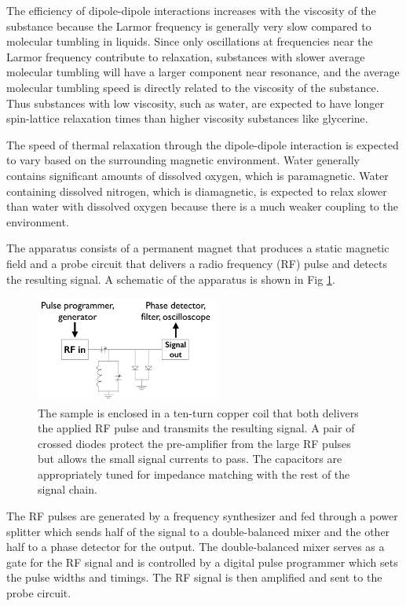 The efficiency of dipole-dipole interactions increases with the viscosity of the substance because the Larmor frequency is generally very slow compared to molecular tumbling in liquids. Since only oscillations at frequencies near the Larmor frequency contribute to relaxation, substances with slower average molecular tumbling will have a larger component near resonance, and the average molecular tumbling speed is directly related to the viscosity of the substance. Thus substances with low viscosity, such as water, are expected to have longer spin-lattice relaxation times than higher viscosity substances like glycerine.

The speed of thermal relaxation through the dipole-dipole interaction is expected to vary based on the surrounding magnetic environment. Water generally contains significant amounts of dissolved oxygen, which is paramagnetic. Water containing dissolved nitrogen, which is diamagnetic, is expected to relax slower than water with dissolved oxygen because there is a much weaker coupling to the environment.

The apparatus consists of a permanent magnet that produces a static magnetic field and a probe circuit that delivers a radio frequency (RF) pulse and detects the resulting signal. A schematic of the apparatus is shown in Fig \ref{fig:app}.

\begin{figure}[htb]
\includegraphics[width=6cm]{apparatus.png}
\caption{The sample is enclosed in a ten-turn copper coil that both delivers the applied RF pulse and transmits the resulting signal. A pair of crossed diodes protect the pre-amplifier from the large RF pulses but allows the small signal currents to pass. The capacitors are appropriately tuned for impedance matching with the rest of the signal chain.}
\label{fig:app}
\end{figure}

The RF pulses are generated by a frequency synthesizer and fed through a power splitter which sends half of the signal to a double-balanced mixer and the other half to a phase detector for the output. The double-balanced mixer serves as a gate for the RF signal and is controlled by a digital pulse programmer which sets the pulse widths and timings. The RF signal is then amplified and sent to the probe circuit. 

